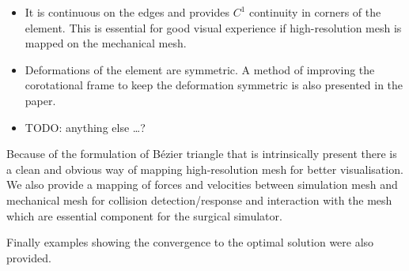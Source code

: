 \documentclass{egpubl}
\begin{document}
\begin{itemize}

    \item It is continuous on the edges and provides $C^1$ continuity in
    corners of the element. This is essential for good visual experience if
    high-resolution mesh is mapped on the mechanical mesh.

    \item Deformations of the element are symmetric. A method of improving
    the corotational frame to keep the deformation symmetric is also
    presented in the paper.

    \item TODO: anything else \ldots? %


\end{itemize}

Because of the formulation of B\'ezier triangle that is intrinsically present
there is a clean and obvious way of mapping high-resolution mesh for
better visualisation. We also provide a mapping of forces and velocities
between simulation mesh and mechanical mesh for collision detection/response
and interaction with the mesh which are essential component for the surgical
simulator.

Finally examples showing the convergence to the optimal solution were also provided. 



%



\end{document}
